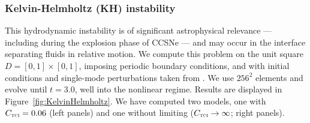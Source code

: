 \documentclass[letterpaper]{jpconf}
\newcommand{\TCI}{\textnormal{\tiny\textsc{TCI}}}
\begin{document}
\subsubsection{Kelvin-Helmholtz (KH) instability}
This hydrodynamic instability is of significant astrophysical relevance --- including during the explosion phase of CCSNe --- and may occur in the interface separating fluids in relative motion.  
We compute this problem on the unit square $D=[0,1]\times[0,1]$, imposing periodic boundary conditions, and with initial conditions and single-mode perturbations taken from \cite{mcnally_etal_2012}.  
We use $256^{2}$ elements and evolve until $t=3.0$, well into the nonlinear regime.  
Results are displayed in Figure~\ref{fig:KelvinHelmholtz}.  
We have computed two models, one with $C_{\TCI}=0.06$ (left panels) and one without limiting ($C_{\TCI}\to\infty$; right panels).  
\end{document}

